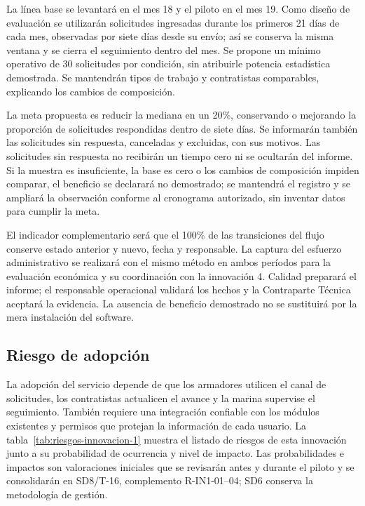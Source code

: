 La línea base se levantará en el mes 18 y el piloto en el mes 19. Como diseño de evaluación se utilizarán solicitudes ingresadas durante los primeros 21 días de cada mes, observadas por siete días desde su envío; así se conserva la misma ventana y se cierra el seguimiento dentro del mes. Se propone un mínimo operativo de 30 solicitudes por condición, sin atribuirle potencia estadística demostrada. Se mantendrán tipos de trabajo y contratistas comparables, explicando los cambios de composición.

La meta propuesta es reducir la mediana en un 20\%, conservando o mejorando la proporción de solicitudes respondidas dentro de siete días. Se informarán también las solicitudes sin respuesta, canceladas y excluidas, con sus motivos. Las solicitudes sin respuesta no recibirán un tiempo cero ni se ocultarán del informe. Si la muestra es insuficiente, la base es cero o los cambios de composición impiden comparar, el beneficio se declarará no demostrado; se mantendrá el registro y se ampliará la observación conforme al cronograma autorizado, sin inventar datos para cumplir la meta.

El indicador complementario será que el 100\% de las transiciones del flujo conserve estado anterior y nuevo, fecha y responsable. La captura del esfuerzo administrativo se realizará con el mismo método en ambos períodos para la evaluación económica y su coordinación con la innovación 4. Calidad preparará el informe; el responsable operacional validará los hechos y la Contraparte Técnica aceptará la evidencia. La ausencia de beneficio demostrado no se sustituirá por la mera instalación del software.


\subsection{Riesgo de adopción}

La adopción del servicio depende de que los armadores utilicen el canal
de solicitudes, los contratistas actualicen el avance y la marina
supervise el seguimiento. También requiere una integración confiable
con los módulos existentes y permisos que protejan la información de
cada usuario. La tabla~\ref{tab:riesgos-innovacion-1} muestra el listado de riesgos de esta innovación junto a su probabilidad de ocurrencia y nivel de impacto. Las probabilidades e impactos son valoraciones
iniciales que se revisarán antes y durante el piloto y se consolidarán
en SD8/T-16, complemento R-IN1-01--04; SD6 conserva la metodología de gestión.

